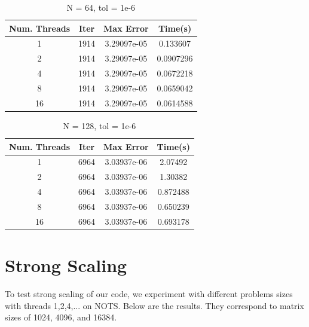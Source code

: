 \documentclass{amsart} %
\begin{document}
\begin{table}[ht]
	\caption{N = 64, tol = 1e-6} %
	\centering %
	\begin{tabular}{c c c c} %
		\hline\hline %
		Num. Threads & Iter & Max Error & Time(s) \\ [0.5ex] %
		\hline %
		1 & 1914 & 3.29097e-05 & 0.133607 \\ %
		2 & 1914 & 3.29097e-05 & 0.0907296 \\
		4 & 1914 & 3.29097e-05 & 0.0672218 \\
		8 & 1914 & 3.29097e-05 & 0.0659042 \\
		16 & 1914 & 3.29097e-05 & 0.0614588 \\ [1ex] %
		\hline %
	\end{tabular}
	\label{table:nonlin} %
\end{table}

\begin{table}[ht]
	\caption{N = 128, tol = 1e-6} %
	\centering %
	\begin{tabular}{c c c c} %
		\hline\hline %
		Num. Threads & Iter & Max Error & Time(s) \\ [0.5ex] %
		\hline %
		1 & 6964 & 3.03937e-06 & 2.07492 \\ %
		2 & 6964 & 3.03937e-06 & 1.30382 \\
		4 & 6964 & 3.03937e-06 & 0.872488 \\
		8 & 6964 & 3.03937e-06 & 0.650239 \\
		16 & 6964 & 3.03937e-06 & 0.693178 \\ [1ex] %
		\hline %
	\end{tabular}
	\label{table:nonlin} %
\end{table}
\FloatBarrier


\section{Strong Scaling}
 To test strong scaling of our code, we experiment with different problems sizes with threads 1,2,4,... on NOTS. Below are the results. They correspond to matrix sizes of 1024, 4096, and 16384.
\end{document}

